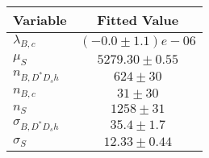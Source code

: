 \begin{tabular}[t]{lc}
\hline
Variable &Fitted Value\\
\hline\hline
$\lambda_{B,c}$&$(-0.0\pm1.1)e-06$\\
\hline
$\mu_S$&$5279.30\pm0.55$\\
\hline
$n_{B, D^* D_s h}$&$624\pm30$\\
\hline
$n_{B,c}$&$31\pm30$\\
\hline
$n_S$&$1258\pm31$\\
\hline
$\sigma_{B, D^* D_s h}$&$35.4\pm1.7$\\
\hline
$\sigma_S$&$12.33\pm0.44$\\
\hline
\end{tabular}